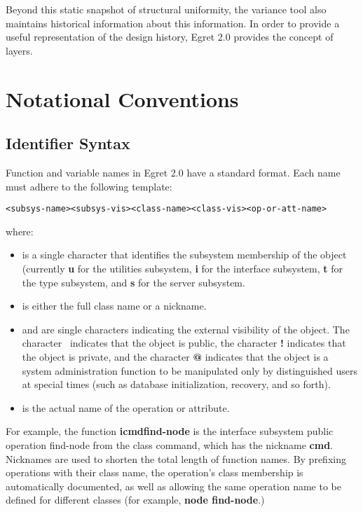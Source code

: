 Beyond this static snapshot of structural uniformity, the variance
tool also maintains historical information about this information.  In
order to provide a useful representation of the design history, Egret
2.0 provides the concept of layers.

\section{Notational Conventions}

\subsection{Identifier Syntax}

Function and variable names in Egret 2.0 have a standard format.
Each name must adhere to the following template:

\small\begin{verbatim}
<subsys-name><subsys-vis><class-name><class-vis><op-or-att-name>
\end{verbatim}\normalsize

\noindent where:
\begin{itemize}
  
\item {\tt <subsys-name>} is a single character that identifies the
  subsystem membership of the object (currently {\bf u} for the
  utilities subsystem, {\bf i} for the interface subsystem, {\bf t}
  for the type subsystem, and {\bf s} for the server subsystem.
  
\item {\tt <class-name>} is either the full class name or a nickname.
  
\item {\tt <subsys-vis>} and {\tt <class-vis>} are single characters
  indicating the external visibility of the object. The character
  \STAR\ indicates that the object is public, the character {\bf !}
  indicates that the object is private, and the character {\bf @}
  indicates that the object is a system administration function to be
  manipulated only by distinguished users at special times (such as
  database initialization, recovery, and so forth).  

  
\item {\tt <op-or-att-name>} is the actual name of the operation or
  attribute.
\end{itemize}

For example, the function {\bf i\STAR cmd\STAR find-node} is the
interface subsystem public operation {\sf find-node} from the class
{\sf command}, which has the nickname {\bf cmd}.  Nicknames are used
to shorten the total length of function names.  By prefixing
operations with their class name, the operation's class membership is
automatically documented, as well as allowing the same operation name
to be defined for different classes (for example, {\bf node\STAR
find-node}.)

